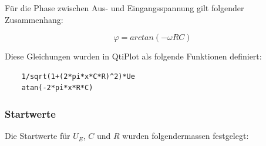 F\"ur   die  Phase   zwischen   Aus-  und   Eingangsspannung  gilt   folgender
Zusammenhang:

\begin{equation}
    \varphi = arctan(-\omega R C)
    \label{eq:rc:phi}
\end{equation}

Diese Gleichungen wurden in QtiPlot als folgende Funktionen definiert:

\begin{verbatim}
    1/sqrt(1+(2*pi*x*C*R)^2)*Ue
    atan(-2*pi*x*R*C)
\end{verbatim}


\subsubsection{Startwerte}
\label{subsubsec:rcglied:startwerte}

Die Startwerte f\"ur $U_E$, $C$ und $R$ wurden folgendermassen festgelegt:

